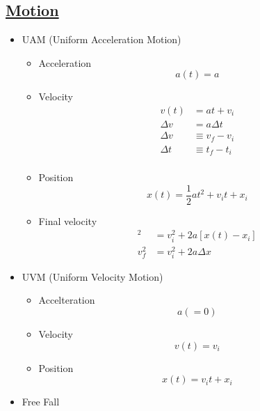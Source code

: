 \documentclass{article}
\begin{document}
\subsection{\underline{Motion}}
\begin{itemize}
  \item UAM (Uniform Acceleration Motion)
  \begin{itemize}
    \item Acceleration
    \begin{equation*}
      a(t) = a
    \end{equation*}
    \item Velocity
    \begin{align*}
      v(t) &= at + v_{i}\\
      \Delta v &= a\Delta t\\
      \Delta v &\equiv v_{f} - v_{i}\\
      \Delta t &\equiv t_{f} - t_{i}\\
    \end{align*}
    \item Position
    \begin{equation*}
      x(t) = \frac{1}{2}at^{2} + v_{i}t + x_{i}
    \end{equation*}
    \item Final velocity
    \begin{align*}
      [v(t)]^{2} &= v_{i}^{2} + 2a[x(t) - x_{i}]\\
      v_{f}^{2} &= v_{i}^{2} + 2a\Delta x
    \end{align*}
  \end{itemize}
  \item UVM (Uniform Velocity Motion)
  \begin{itemize}
    \item Accelteration
    \begin{equation*}
      a( = 0)
    \end{equation*}
    \item Velocity
    \begin{equation*}
      v(t) = v_{i}
    \end{equation*}
    \item Position
    \begin{equation*}
      x(t) = v_{i}t + x_{i}
    \end{equation*}
  \end{itemize}
  \item Free Fall\\
  \begin{itemize}

\end{itemize}
\end{itemize}
\end{document}
